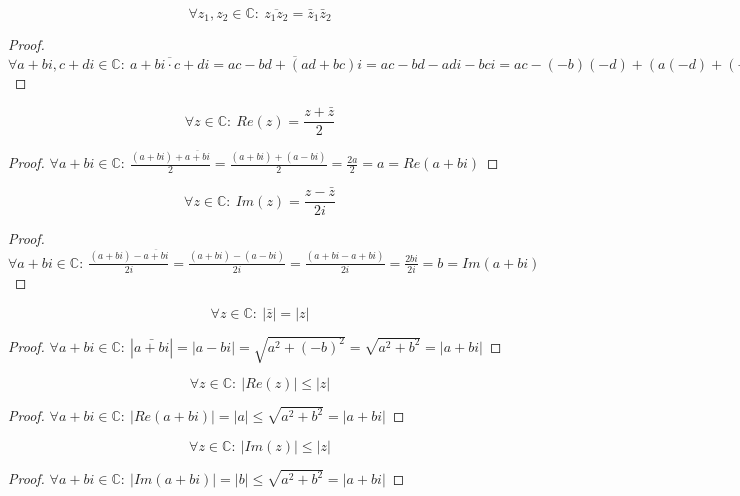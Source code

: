 \documentclass[main.tex]{subfiles}
\begin{document}
\begin{pr}
  \[ \forall z_{1},z_{2}\in \mathbb{C}:\ \overline{z_{1}z_{2}} = \bar{z}_{1}  \bar{z}_{2} \]

  \begin{proof}
    $\forall a+bi,c+di \in \mathbb{C}:\ \overline{a+bi \cdot c+di} = \overline{ac-bd + (ad+bc)i} = ac-bd - adi - bci = ac-(-b)(-d) + (a(-d)+(-b)c)i = \overline{a+bi} \cdot \overline{c+di} $
  \end{proof}
\end{pr}

\begin{pr}
  \[ \forall z\in \mathbb{C}:\ Re(z) = \frac{z+\bar{z}}{2} \]

  \begin{proof}
    $\forall a+bi\in \mathbb{C}:\ \frac{(a+bi)+\overline{a+bi}}{2} = \frac{(a+bi)+(a-bi)}{2} = \frac{2a}{2} = a = Re(a+bi)$
  \end{proof}
\end{pr}

\begin{pr}
  \[ \forall z\in \mathbb{C}:\ Im(z) = \frac{z-\bar{z}}{2i} \]

  \begin{proof}
    $\forall a+bi\in \mathbb{C}:\ \frac{(a+bi)-\overline{a+bi}}{2i} = \frac{(a+bi)-(a-bi)}{2i} = \frac{(a+bi-a+bi)}{2i} = \frac{2bi}{2i} = b = Im(a+bi) $
  \end{proof}
\end{pr}

\begin{pr}
  \[ \forall z\in \mathbb{C}:\ |\bar{z}| = |z| \]

  \begin{proof}
    $\forall a+bi\in \mathbb{C}:\ |\bar{a+bi}| = |a-bi| = \sqrt{a^{2}+(-b)^{2}} = \sqrt{a^{2}+b^{2}} = |a+bi|$
  \end{proof}
\end{pr}

\begin{pr}
  \label{pr:reel-deel-kleiner}
  \[ \forall z\in \mathbb{C}:\ |Re(z)| \le |z| \]

  \begin{proof}
    $\forall a+bi\in \mathbb{C}:\  |Re(a+bi)| = |a| \le \sqrt{a^{2}+b^{2}} = |a+bi|$ 
  \end{proof}
\end{pr}

\begin{pr}
  \label{pr:imaginair-deel-kleiner}
  \[ \forall z\in \mathbb{C}:\ |Im(z)| \le |z|\]

  \begin{proof}
    $\forall a+bi\in \mathbb{C}:\  |Im(a+bi)| = |b| \le \sqrt{a^{2}+b^{2}} = |a+bi|$ 
  \end{proof}
\end{pr}
\end{document}
